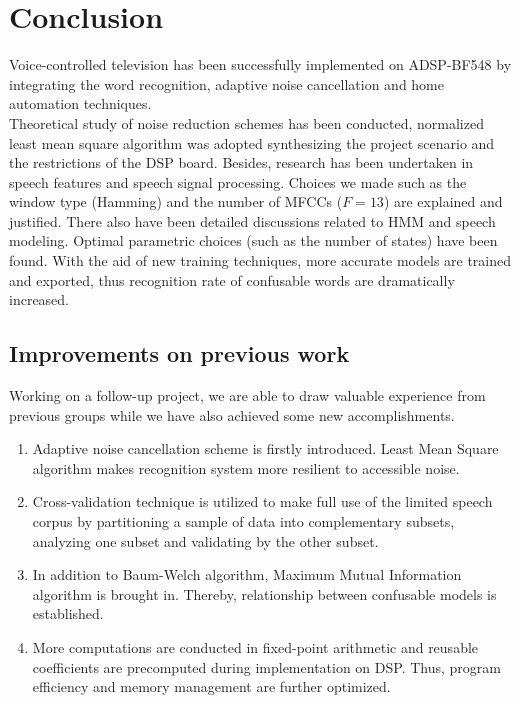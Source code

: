 \chapter{Conclusion}
\label{chapter:conclusion}

Voice-controlled television has been successfully implemented on ADSP-BF548 by integrating the word recognition, adaptive noise cancellation and home automation techniques.\\

Theoretical study of noise reduction schemes has been conducted, normalized least mean square algorithm was adopted synthesizing the project scenario and the restrictions of the DSP board. Besides, research has been undertaken in speech features and speech signal processing. Choices we made such as the window type (Hamming) and the number of MFCCs ($F = 13$) are explained and justified. There also have been detailed discussions related to HMM and speech modeling. Optimal parametric choices (such as the number of states) have been found. With the aid of new training techniques, more accurate models are trained and exported, thus recognition rate of confusable words are dramatically increased.


\section{Improvements on previous work}

Working on a follow-up project, we are able to draw valuable experience from previous groups while we have also achieved some new accomplishments.

\begin{enumerate}
\item Adaptive noise cancellation scheme is firstly introduced. Least Mean Square algorithm makes recognition system more resilient to accessible noise.
\item Cross-validation technique is utilized to make full use of the limited speech corpus by partitioning a sample of data into complementary subsets, analyzing one subset and validating by the other subset.
\item In addition to Baum-Welch algorithm, Maximum Mutual Information algorithm is brought in. Thereby, relationship between confusable models is established.
\item More computations are conducted in fixed-point arithmetic and reusable coefficients are precomputed during implementation on DSP. Thus, program efficiency and memory management are further optimized.
\end{enumerate}


